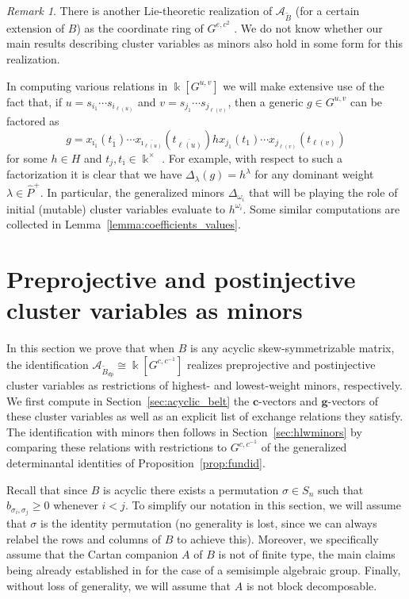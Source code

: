 \documentclass[12pt]{amsart}
\newcommand{\sayDR}[1]{\say[DR]{\color{red}{\bf DR:}\;#1}}
\newcommand{\cA}{\mathcal{A}}
\newcommand{\kk}{\Bbbk}
\newcommand{\bfc}{\mathbf{c}}
\newcommand{\bfg}{\mathbf{g}}
\newcommand{\ol}[1]{\overline{#1}}
\newcommand{\Bdp}{\widetilde{B}_{dp}}
\theoremstyle{remark}
\newtheorem{remark}[theorem]{Remark}
\numberwithin{equation}{section}
\numberwithin{figure}{section}
\begin{document}
\begin{remark}
There is another Lie-theoretic realization of $\cA_{\widetilde{B}}$ (for a certain extension of $B$) as the coordinate ring of $G^{e,c^2}$ \cite{GLS11}. %
We do not know whether our main results describing cluster variables as minors also hold in some form for this realization.

\end{remark}

In computing various relations in $\kk[G^{u,v}]$ we will make extensive use of the fact that, if $u=s_{i_1}\cdots s_{i_{\ell(u)}}$ and $v=s_{j_1}\cdots s_{j_{\ell(v)}}$, then a generic $g \in G^{u,v}$ can be factored as
\begin{equation}
  \label{eq:uvfactorization}
  g = x_{\ol{\imath_1}}(t_{\ol{1}})\cdots x_{\ol{\imath_{\ell(u)}}}(t_{\ol{\ell(u)}})hx_{j_1}(t_{1}) \cdots x_{j_{\ell(v)}}(t_{\ell(v)})
\end{equation}
for some $h \in H$ and $t_j, t_{\ol{\imath}} \in \kk^\times$ \cite{FZ99,Wil13}.
For example, with respect to such a factorization it is clear that we have $\Delta_\lambda(g) = h^\lambda$ for any dominant weight $\lambda \in \widehat{P}^+$.
In particular, the generalized minors $\Delta_{\omega_i}$ that will be playing the role of initial (mutable) cluster variables evaluate to $h^{\omega_i}$.
Some similar computations are collected in Lemma~\ref{lemma:coefficients_values}.

\section{Preprojective and postinjective cluster variables as minors}
\label{sec:preproj}
In this section we prove that when $B$ is any acyclic skew-symmetrizable matrix, the identification $\cA_{\Bdp} \cong \kk[G^{c,c^{-1}}]$ realizes preprojective and postinjective cluster variables as restrictions of highest- and lowest-weight minors, respectively.
We first compute in Section~\ref{sec:acyclic_belt} the $\bfc$-vectors and $\bfg$-vectors of these cluster variables as well as an explicit list of exchange relations they satisfy. 
The identification with minors then follows in Section~\ref{sec:hlwminors} by comparing these relations with restrictions to $G^{c,c^{-1}}$ of the generalized determinantal identities of Proposition~\ref{prop:fundid}.

Recall that since $B$ is acyclic there exists a permutation $\sigma\in S_n$ such that $b_{\sigma_i,\sigma_j}\geq 0$ whenever $i<j$.
To simplify our notation in this section, we will assume that $\sigma$ is the identity permutation (no generality is lost, since we can always relabel the rows and columns of $B$ to achieve this).
Moreover, we specifically assume that the Cartan companion $A$ of $B$ is not of finite type, the main claims being already established in \cite{YZ08} for the case of a semisimple algebraic group.
Finally, without loss of generality, we will assume that $A$ is not block decomposable.
\end{document}
